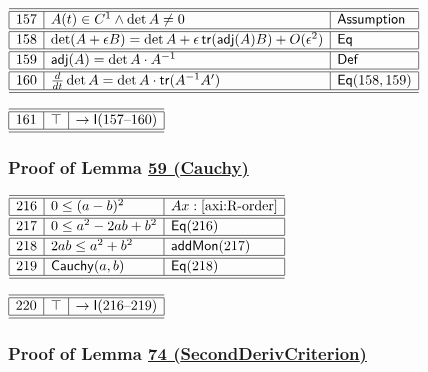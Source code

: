\documentclass[11pt,reqno]{amsart}
\begin{document}
\noindent$%
\begin{array}{|r|l|l|}
\hline\hline
157 & A(t)\in C^{1}\wedge\det A\neq0 & \textsf{Assumption} \\ \hline\hline
158 & \det(A+\epsilon B)=\det A+\epsilon\,\mathsf{tr}(\mathsf{adj}(A)B)+O(\epsilon^{2}) & \mathsf{Eq} \\ \hline\hline
159 & \mathsf{adj}(A)=\det A\cdot A^{-1} & \mathsf{Def} \\ \hline\hline
160 & \tfrac{d}{dt}\det A=\det A\cdot\mathsf{tr}(A^{-1}A^{\prime }) & \mathsf{Eq}(158,159) \\ \hline\hline
\end{array}%
$

\medskip

\noindent$%
\begin{array}{|r|l|l|}
\hline\hline
161 & \top & \to\mathsf{I}(157\text{--}160) \\ \hline\hline
\end{array}%
$

\medskip

\subsubsection*{Proof of Lemma \hyperlink{lem:Cauchy}{59 (\textsf{Cauchy})}}

\noindent$%
\begin{array}{|r|l|l|}
\hline\hline
216 & 0\le(a-b)^{2} & Ax:\ref{axi:R-order} \\ \hline\hline
217 & 0\le a^{2}-2ab+b^{2} & \mathsf{Eq}(216) \\ \hline\hline
218 & 2ab\le a^{2}+b^{2} & \mathsf{addMon}(217) \\ \hline\hline
219 & \mathsf{Cauchy}(a,b) & \mathsf{Eq}(218) \\ \hline\hline
\end{array}%
$

\medskip

\noindent$%
\begin{array}{|r|l|l|}
\hline\hline
220 & \top & \to\mathsf{I}(216\text{--}219) \\ \hline\hline
\end{array}%
$

\medskip

\subsubsection*{Proof of Lemma \hyperlink{lem:SecondDerivCriterion}{74 (\textsf{SecondDerivCriterion})}}
\end{document}
